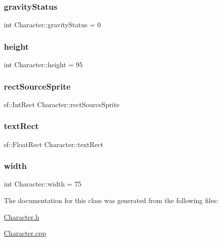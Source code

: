 \mbox{\label{class_character_a40b71119c7b457c7fec3a90a012da631}} 
\subsubsection{\texorpdfstring{gravity\+Status}{gravityStatus}}
{\footnotesize\ttfamily int Character\+::gravity\+Status = 0}

\mbox{\label{class_character_a1f7e996c91a75a5e037bebcf0bf3ac06}} 
\subsubsection{\texorpdfstring{height}{height}}
{\footnotesize\ttfamily int Character\+::height = 95}

\mbox{\label{class_character_a8461b99479fbc94d4b001b61f49bcafe}} 
\subsubsection{\texorpdfstring{rect\+Source\+Sprite}{rectSourceSprite}}
{\footnotesize\ttfamily sf\+::\+Int\+Rect Character\+::rect\+Source\+Sprite}

\mbox{\label{class_character_ab0ce752b24dd3ac9252be132b046c917}} 
\subsubsection{\texorpdfstring{text\+Rect}{textRect}}
{\footnotesize\ttfamily sf\+::\+Float\+Rect Character\+::text\+Rect}

\mbox{\label{class_character_aa945d94f4ee6ec02e5cf1fb753c94d8f}} 
\subsubsection{\texorpdfstring{width}{width}}
{\footnotesize\ttfamily int Character\+::width = 75}



The documentation for this class was generated from the following files\+:\begin{DoxyCompactItemize}
\item 
\hyperlink{_character_8h}{Character.\+h}\item 
\hyperlink{_character_8cpp}{Character.\+cpp}\end{DoxyCompactItemize}
